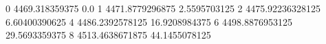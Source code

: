 0 4469.318359375 0.0
1 4471.8779296875 2.5595703125
2 4475.92236328125 6.60400390625
4 4486.2392578125 16.9208984375
6 4498.8876953125 29.5693359375
8 4513.4638671875 44.1455078125
